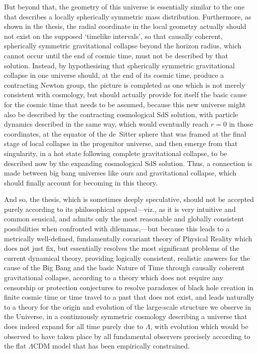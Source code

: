 But beyond that, the geometry of this universe is essentially similar to the one that describes a locally spherically symmetric mass distribution. Furthermore, as shown in the thesis, the radial coordinate in the local geometry actually should not exist on the supposed `timelike intervals', so that causally coherent, spherically symmetric gravitational collapse beyond the horizon radius, which cannot occur until the end of cosmic time, must not be described by that solution. Instead, by hypothesising that spherically symmetric gravitational collapse in one universe should, at the end of its cosmic time, produce a contracting Newton group, the picture is completed as one which is not merely consistent with cosmology, but should actually provide for itself the basic cause for the cosmic time that needs to be assumed, because this new universe might also be described by the contracting cosmological SdS solution, with particle dynamics described in the same way, which would eventually reach $r=0$ in those coordinates, at the equator of the de~Sitter sphere that was framed at the final stage of local collapse in the progenitor universe, and then emerge from that singularity, in a hot state following complete gravitational collapse, to be described now by the expanding cosmological SdS solution. Thus, a connection is made between big bang universes like ours and gravitational collapse, which should finally account for becoming in this theory.

And so, the thesis, which is sometimes deeply speculative, should not be accepted purely according to its philosophical appeal---viz., as it is very intuitive and common sensical, and admits only the most reasonable and globally consistent possibilities when confronted with dilemmas,---but because this leads to a metrically well-defined, fundamentally covariant theory of Physical Reality which does not just fix, but essentially resolves the most significant problems of the current dynamical theory, providing logically consistent, realistic answers for the cause of the Big Bang and the basic Nature of Time through causally coherent gravitational collapse, according to a theory which does not require any censorship or protection conjectures to resolve paradoxes of black hole creation in finite cosmic time or time travel to a past that does not exist, and leads naturally to a theory for the origin and evolution of the large-scale structure we observe in the Universe, in a continuously symmetric cosmology describing a universe that does indeed expand for all time purely due to $\Lambda$, with evolution which would be observed to have taken place by all fundamental observers precisely according to the flat $\Lambda$CDM model that has been empirically constrained.\\\\\\








